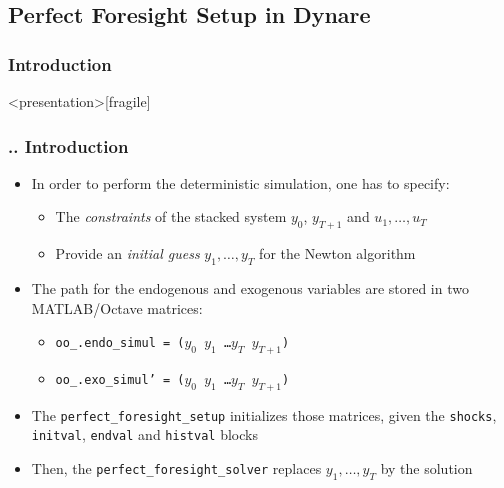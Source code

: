 \documentclass[11pt,aspectratio=169]{beamer}
\begin{document}
\subsection{Perfect Foresight Setup in Dynare}
\subsubsection{Introduction}
\begin{frame}<presentation>[fragile]
	\frametitle{{\thesection.\thesubsection.\thesubsubsection} Introduction}
	\begin{itemize}
		\item In order to perform the deterministic simulation, one has to specify:
		\begin{itemize}
			\item The \textit{constraints} of the stacked system $y_0$, $y_{T+1}$ and $u_1, \ldots , u_T$
			\item Provide an \textit{initial guess} $y_1, \ldots , y_T$ for the Newton algorithm 
		\end{itemize} 
		\item The path for the endogenous and exogenous variables are stored in two MATLAB/Octave matrices:
		\begin{itemize}
			\item \texttt{oo\_.endo\_simul = ($y_0$  $y_1$ \ldots \enspace  $y_T$  $y_{T+1}$)}
			\item \texttt{oo\_.exo\_simul' = ($y_0$  $y_1$ \ldots \enspace  $y_T$  $y_{T+1}$)}
		\end{itemize}
		\item The \texttt{perfect\_foresight\_setup} initializes those matrices, given the \texttt{shocks}, \texttt{initval}, \texttt{endval} and \texttt{histval} blocks
		\item Then, the \texttt{perfect\_foresight\_solver} replaces $y_1,\ldots,y_T$ by the solution 
	\end{itemize}
\end{frame}
\end{document}
